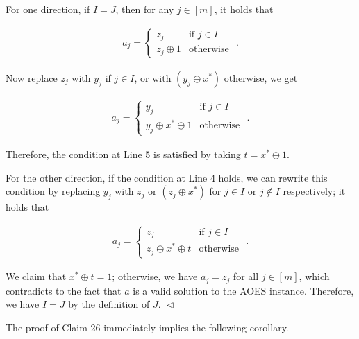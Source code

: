 \documentclass[10pt,a4paper]{article}
\begin{document}
For one direction, if $I=J$, then for any $j\in[m]$, it holds that\par


\[\begin{gathered}
a_{j}=\begin{cases}z_{j}&\text{if }j\in I\\
z_{j}\oplus 1&\text{otherwise }\end{cases}.
\end{gathered}\]




Now replace $z_{j}$ with $y_{j}$ if $j\in I$, or with $(y_{j}\oplus x^{*})$ otherwise, we get\par


\[\begin{gathered}
a_{j}=\begin{cases}y_{j}&\text{if }j\in I\\
y_{j}\oplus x^{*}\oplus 1&\text{otherwise }\end{cases}.
\end{gathered}\]




Therefore, the condition at Line 5 is satisfied by taking $t=x^{*}\oplus 1$.\par




For the other direction, if the condition at Line 4 holds, we can rewrite this condition by replacing $y_{j}$ with $z_{j}$ or $(z_{j}\oplus x^{*})$ for $j\in I$ or $j\not\in I$ respectively; it holds that\par


\[\begin{gathered}
a_{j}=\begin{cases}z_{j}&\text{if }j\in I\\
z_{j}\oplus x^{*}\oplus t&\text{otherwise }\end{cases}.
\end{gathered}\]




We claim that $x^{*}\oplus t=1$; otherwise, we have $a_{j}=z_{j}$ for all $j\in[m]$, which contradicts to the fact that $a$ is a valid solution to the AOES instance. Therefore, we have $I=J$ by the definition of $J$.
$\vartriangleleft$\par




The proof of Claim 26 immediately implies the following corollary.\par
\end{document}
